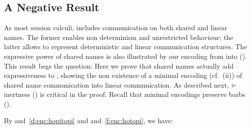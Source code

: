 
\subsection{A Negative Result}
\noi As most session calculi, 
\HOp includes communication on both shared and linear names.
The former enables non determinism and unrestricted behaviour; the latter allows to represent
deterministic and linear communication structures.
The expressive power of shared names is also illustrated by our 
encoding from \HOp into \sessp ().
This result begs the question: 
Here we prove that shared names actually add expressiveness to \HOp,
showing 
the non existence of a minimal encoding 
(cf.~(ii))
of shared name communication into linear 
communication. 
As described next, 
$\tau$-inertness () is critical in the proof.
Recall that minimal encodings preserve barbs ().

\smallskip 


\smallskip 

By 
	 and~\ref{d:enc:hopitopi} 
	and  and~\ref{f:enc:hotopi}, 
we have:
\smallskip 
{}


